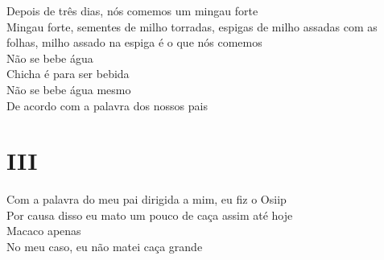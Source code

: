 \begin{linenumbers}\begingroup\raggedright
 
\noindent Depois de três dias, nós comemos um mingau forte\\
 Mingau forte, sementes de milho torradas, espigas de milho assadas com as folhas, milho assado na espiga é o que nós comemos\\
 Não se bebe água\\
 Chicha é para ser bebida\\
 Não se bebe água mesmo\\
 De acordo com a palavra dos nossos pais
 
 
 \medskip
 \section{III}

 \noindent Com a palavra do meu pai dirigida a mim, eu fiz o Osiip\\
 Por causa disso eu mato um pouco de caça assim até hoje\\
 Macaco apenas\\
 No meu caso, eu não matei caça grande
 
\end{linenumbers}\endgroup

\bigskip

